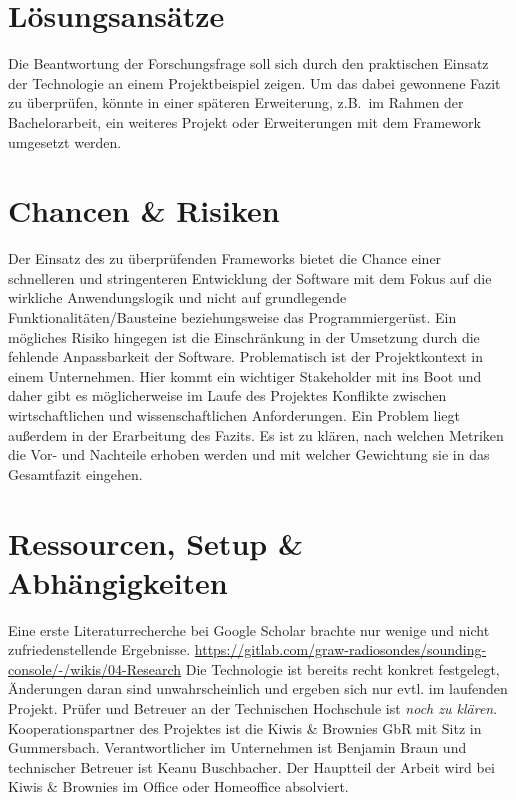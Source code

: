 \documentclass[a4paper,11pt]{article}%
\renewcommand{\\}{\vspace*{0.5\baselineskip} \newline}
\begin{document}
    \section{Lösungsansätze}
    Die Beantwortung der Forschungsfrage soll sich durch den praktischen Einsatz der Technologie an einem Projektbeispiel zeigen.
    Um das dabei gewonnene Fazit zu überprüfen, könnte in einer späteren Erweiterung, z.B.\ im Rahmen der Bachelorarbeit, ein weiteres Projekt oder Erweiterungen mit dem Framework umgesetzt werden.

    \newpage


    \section{Chancen \& Risiken}
    Der Einsatz des zu überprüfenden Frameworks bietet die Chance einer schnelleren und stringenteren Entwicklung der Software mit dem Fokus auf die wirkliche Anwendungslogik und nicht auf grundlegende Funktionalitäten/Bausteine beziehungsweise das Programmiergerüst.
    Ein mögliches Risiko hingegen ist die Einschränkung in der Umsetzung durch die fehlende Anpassbarkeit der Software.
    \\
    Problematisch ist der Projektkontext in einem Unternehmen.
    Hier kommt ein wichtiger Stakeholder mit ins Boot und daher gibt es möglicherweise im Laufe des Projektes Konflikte zwischen wirtschaftlichen und wissenschaftlichen Anforderungen.
    \\
    Ein Problem liegt außerdem in der Erarbeitung des Fazits.
    Es ist zu klären, nach welchen Metriken die Vor- und Nachteile erhoben werden und mit welcher Gewichtung sie in das Gesamtfazit eingehen.


    \section{Ressourcen, Setup \& Abhängigkeiten}
    Eine erste Literaturrecherche bei Google Scholar brachte nur wenige und nicht zufriedenstellende Ergebnisse.
    \newline
    \href{https://gitlab.com/graw-radiosondes/sounding-console/-/wikis/04-Research}{https://gitlab.com/graw-radiosondes/sounding-console/-/wikis/04-Research}
    \\
    Die Technologie ist bereits recht konkret festgelegt, Änderungen daran sind unwahrscheinlich und ergeben sich nur evtl. im laufenden Projekt.
    \\
    Prüfer und Betreuer an der Technischen Hochschule ist \textit{noch zu klären}.
    \\
    Kooperationspartner des Projektes ist die Kiwis \& Brownies GbR mit Sitz in Gummersbach.
    Verantwortlicher im Unternehmen ist Benjamin Braun und technischer Betreuer ist Keanu Buschbacher.
    \\
    Der Hauptteil der Arbeit wird bei Kiwis \& Brownies im Office oder Homeoffice absolviert.
\end{document}
